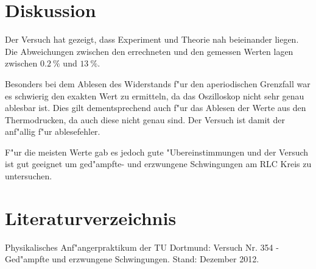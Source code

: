 \newpage
\section{Diskussion}
	\label{sec:diskussion}

	Der Versuch hat gezeigt, dass Experiment und Theorie nah beieinander liegen.
	Die Abweichungen zwischen den errechneten und den gemessen Werten lagen zwischen $\SI{0.2}{\%}$ und $\SI{13}{\%}$.

	Besonders bei dem Ablesen des Widerstands f"ur den aperiodischen Grenzfall war es schwierig den exakten Wert zu ermitteln, da das Oszilloskop nicht sehr genau ablesbar ist.
	Dies gilt dementsprechend auch f"ur das Ablesen der Werte aus den Thermodrucken, da auch diese nicht genau sind.
	Der Versuch ist damit der anf"allig f"ur ablesefehler.

	F"ur die meisten Werte gab es jedoch gute "Ubereinstimmungen und der Versuch ist gut geeignet um ged"ampfte- und erzwungene Schwingungen am RLC Kreis zu untersuchen.

\section{Literaturverzeichnis}
	\label{sec:literaturverzeichnis}

	\begin{thebibliography}{9}
		 Physikalisches Anf"angerpraktikum der TU Dortmund: Versuch Nr. 354 - Ged"ampfte und erzwungene Schwingungen. Stand: Dezember 2012.
	\end{thebibliography}
